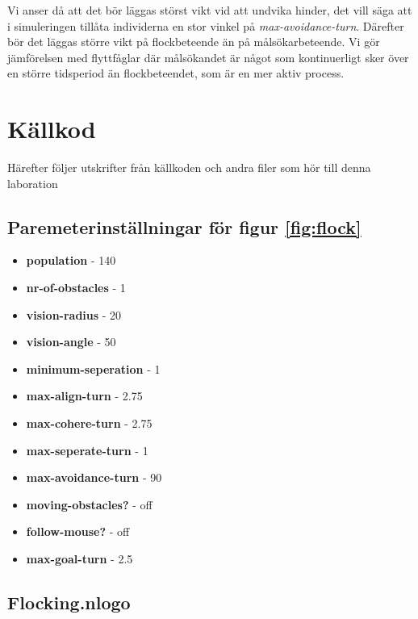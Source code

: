 \documentclass[titlepage, a4paper, 12pt]{article}
\begin{document}
Vi anser då att det bör läggas störst vikt vid att undvika
hinder, det vill säga att i simuleringen tillåta individerna en stor
vinkel på \textit{max-avoidance-turn}. Därefter bör det läggas större
vikt på flockbeteende än på målsökarbeteende. Vi gör jämförelsen med
flyttfåglar där målsökandet är något som kontinuerligt sker över en
större tidsperiod än flockbeteendet, som är en mer aktiv process.

\newpage
\appendix
{}
\section{Källkod}\label{sec:kallkod}
Härefter följer utskrifter från källkoden och andra filer som hör till
denna laboration

\subsection{Paremeterinställningar för figur \ref{fig:flock}}\label{app:flock}
\begin{itemize}
\item \textbf{population} - 140
\item \textbf{nr-of-obstacles} - 1
\item \textbf{vision-radius} - 20
\item \textbf{vision-angle} - 50
\item \textbf{minimum-seperation} - 1
\item \textbf{max-align-turn} - 2.75
\item \textbf{max-cohere-turn} - 2.75
\item \textbf{max-seperate-turn} - 1
\item \textbf{max-avoidance-turn} - 90
\item \textbf{moving-obstacles?} - off
\item \textbf{follow-mouse?} - off
\item \textbf{max-goal-turn} - 2.5
\end{itemize}

\subsection{Flocking.nlogo}\label{app:Flocking.nlogo}
\begin{footnotesize}
  
\end{footnotesize}
\end{document}
